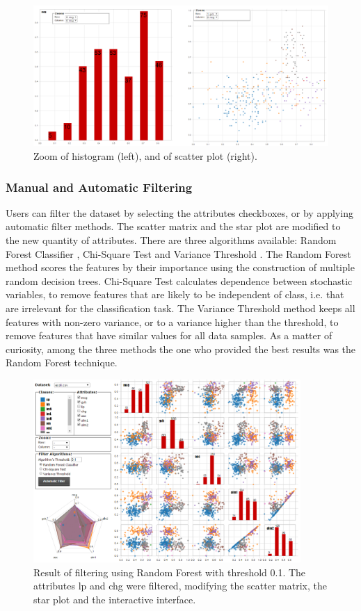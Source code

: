 \documentclass[journal]{IEEEtran}
\begin{document}
\begin{figure}[!t]
  \centering
  \captionsetup{justification=centering}
  \includegraphics[width=6.0in]{images/zoom}
  \caption{Zoom of histogram (left), and of scatter plot (right).}
  \label{fig:zoom}
\end{figure}

\subsubsection{Manual and Automatic Filtering}
Users can filter the dataset by selecting the attributes checkboxes, or by applying automatic filter methods. The scatter matrix and the star plot are modified to the new quantity of attributes. There are three algorithms available: Random Forest Classifier \cite{breiman2001random}, Chi-Square Test \cite{moore1976chi} and Variance Threshold \cite{wang2010comparative}. The Random Forest method scores the features by their importance using the construction of multiple random decision trees. Chi-Square Test calculates dependence between stochastic variables, to remove features that are likely to be independent of class, i.e. that are irrelevant for the classification task. The Variance Threshold method keeps all features with non-zero variance, or to a variance higher than the threshold, to remove features that have similar values for all data samples. As a matter of curiosity, among the three methods the one who provided the best results was the Random Forest technique.

\begin{figure}[!t]
  \centering
  \captionsetup{justification=centering}
  \includegraphics[width=4.0in]{images/filtering}
  \caption{Result of filtering using Random Forest with threshold 0.1. The attributes lp and chg were filtered, modifying the scatter matrix, the star plot and the interactive interface.}
  \label{fig:filtering}
\end{figure}
\end{document}
